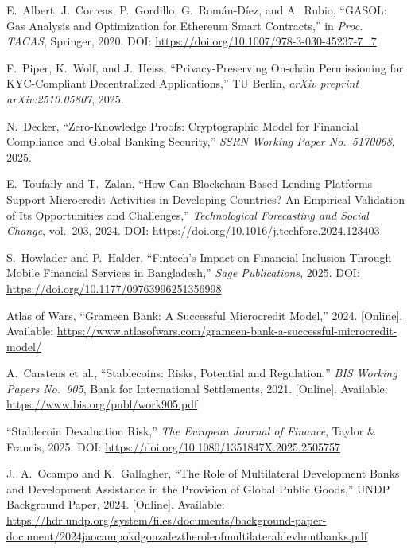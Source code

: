 \documentclass[12pt,a4paper]{report}
\begin{document}
{\begin{enumerate}[label={[\arabic*]}]
\item E.~Albert, J.~Correas, P.~Gordillo, G.~Rom\'{a}n-D\'{i}ez, and A.~Rubio, ``GASOL: Gas Analysis and Optimization for Ethereum Smart Contracts,'' in \textit{Proc. TACAS}, Springer, 2020. DOI: \url{https://doi.org/10.1007/978-3-030-45237-7_7}

\item F.~Piper, K.~Wolf, and J.~Heiss, ``Privacy-Preserving On-chain Permissioning for KYC-Compliant Decentralized Applications,'' TU Berlin, \textit{arXiv preprint arXiv:2510.05807}, 2025.

\item N.~Decker, ``Zero-Knowledge Proofs: Cryptographic Model for Financial Compliance and Global Banking Security,'' \textit{SSRN Working Paper No.~5170068}, 2025.

\item E.~Toufaily and T.~Zalan, ``How Can Blockchain-Based Lending Platforms Support Microcredit Activities in Developing Countries? An Empirical Validation of Its Opportunities and Challenges,'' \textit{Technological Forecasting and Social Change}, vol.~203, 2024. DOI: \url{https://doi.org/10.1016/j.techfore.2024.123403}

\item S.~Howlader and P.~Halder, ``Fintech's Impact on Financial Inclusion Through Mobile Financial Services in Bangladesh,'' \textit{Sage Publications}, 2025. DOI: \url{https://doi.org/10.1177/09763996251356998}

\item Atlas of Wars, ``Grameen Bank: A Successful Microcredit Model,'' 2024. [Online]. Available: \url{https://www.atlasofwars.com/grameen-bank-a-successful-microcredit-model/}

\item A.~Carstens et al., ``Stablecoins: Risks, Potential and Regulation,'' \textit{BIS Working Papers No.~905}, Bank for International Settlements, 2021. [Online]. Available: \url{https://www.bis.org/publ/work905.pdf}

\item ``Stablecoin Devaluation Risk,'' \textit{The European Journal of Finance}, Taylor \& Francis, 2025. DOI: \url{https://doi.org/10.1080/1351847X.2025.2505757}

\item J.~A.~Ocampo and K.~Gallagher, ``The Role of Multilateral Development Banks and Development Assistance in the Provision of Global Public Goods,'' UNDP Background Paper, 2024. [Online]. Available: \url{https://hdr.undp.org/system/files/documents/background-paper-document/2024jaocampokdgonzaleztheroleofmultilateraldevlmntbanks.pdf}


\end{enumerate}}
\end{document}
